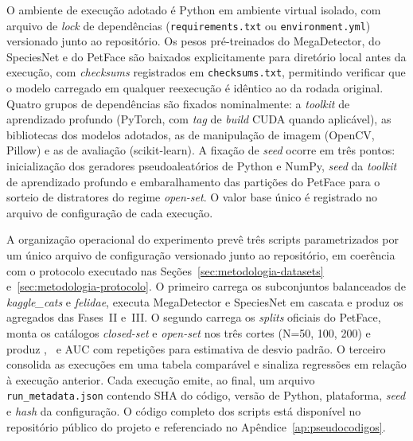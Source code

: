 O ambiente de execução adotado é Python em ambiente virtual isolado, com arquivo de \textit{lock} de dependências (\texttt{requirements.txt} ou \texttt{environment.yml}) versionado junto ao repositório. Os pesos pré-treinados do MegaDetector, do SpeciesNet e do PetFace são baixados explicitamente para diretório local antes da execução, com \textit{checksums} registrados em \texttt{checksums.txt}, permitindo verificar que o modelo carregado em qualquer reexecução é idêntico ao da rodada original. Quatro grupos de dependências são fixados nominalmente: a \textit{toolkit} de aprendizado profundo (PyTorch, com \textit{tag} de \textit{build} CUDA quando aplicável), as bibliotecas dos modelos adotados, as de manipulação de imagem (OpenCV, Pillow) e as de avaliação (scikit-learn). A fixação de \textit{seed} ocorre em três pontos: inicialização dos geradores pseudoaleatórios de Python e NumPy, \textit{seed} da \textit{toolkit} de aprendizado profundo e embaralhamento das partições do PetFace para o sorteio de distratores do regime \textit{open-set}. O valor base único é registrado no arquivo de configuração de cada execução.

A organização operacional do experimento prevê três scripts parametrizados por um único arquivo de configuração versionado junto ao repositório, em coerência com o protocolo executado nas Seções~\ref{sec:metodologia-datasets} e~\ref{sec:metodologia-protocolo}. O primeiro carrega os subconjuntos balanceados de \textit{kaggle\_cats} e \textit{felidae}, executa MegaDetector e SpeciesNet em cascata e produz os agregados das Fases~II e~III. O segundo carrega os \textit{splits} oficiais do PetFace, monta os catálogos \textit{closed-set} e \textit{open-set} nos três cortes (N=50, 100, 200) e produz , \mAP\ e AUC com repetições para estimativa de desvio padrão. O terceiro consolida as execuções em uma tabela comparável e sinaliza regressões em relação à execução anterior. Cada execução emite, ao final, um arquivo \texttt{run\_metadata.json} contendo SHA do código, versão de Python, plataforma, \textit{seed} e \textit{hash} da configuração. O código completo dos scripts está disponível no repositório público do projeto e referenciado no Apêndice~\ref{ap:pseudocodigos}.
